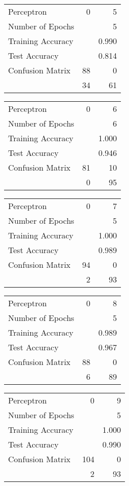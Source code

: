 \documentclass[11pt]{article}
\begin{document}
\begin{minipage}[t]{0.5\textwidth}
\begin{tabular}{|l | r r|}
\hline Perceptron & 0 & 5\\
Number of Epochs & & 5\\
Training Accuracy & & 0.990\\
Test Accuracy & & 0.814\\
Confusion Matrix & 88 & 0\\
 &34 & 61\\ \hline
\end{tabular}
\end{minipage}
\begin{minipage}[t]{0.5\textwidth}
\begin{tabular}{|l | r r|}
\hline Perceptron & 0 & 6\\
Number of Epochs & & 6\\
Training Accuracy & & 1.000\\
Test Accuracy & & 0.946\\
Confusion Matrix & 81 & 10\\
 &0 & 95\\ \hline
\end{tabular}
\end{minipage}
\begin{minipage}[t]{0.5\textwidth}
\begin{tabular}{|l | r r|}
\hline Perceptron & 0 & 7\\
Number of Epochs & & 5\\
Training Accuracy & & 1.000\\
Test Accuracy & & 0.989\\
Confusion Matrix & 94 & 0\\
 &2 & 93\\ \hline
\end{tabular}
\end{minipage}
\begin{minipage}[t]{0.5\textwidth}
\begin{tabular}{|l | r r|}
\hline Perceptron & 0 & 8\\
Number of Epochs & & 5\\
Training Accuracy & & 0.989\\
Test Accuracy & & 0.967\\
Confusion Matrix & 88 & 0\\
 &6 & 89\\ \hline
\end{tabular}
\end{minipage}
\begin{minipage}[t]{0.5\textwidth}
\begin{tabular}{|l | r r|}
\hline Perceptron & 0 & 9\\
Number of Epochs & & 5\\
Training Accuracy & & 1.000\\
Test Accuracy & & 0.990\\
Confusion Matrix & 104 & 0\\
 &2 & 93\\ \hline
\end{tabular}
\end{minipage}
\end{document}
